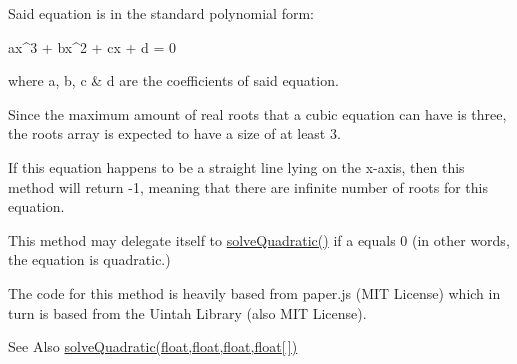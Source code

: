 Said equation is in the standard polynomial form\-: \begin{DoxyVerb}ax^3 + bx^2 + cx + d = 0
\end{DoxyVerb}


where {\ttfamily a}, {\ttfamily b}, {\ttfamily c} \& {\ttfamily d} are the coefficients of said equation.

Since the maximum amount of real roots that a cubic equation can have is three, the {\ttfamily roots} array is expected to have a size of at least 3.

If this equation happens to be a straight line lying on the x-\/axis, then this method will return {\ttfamily -\/1}, meaning that there are infinite number of roots for this equation.

This method may delegate itself to {\ttfamily \hyperlink{classhype_1_1core_1_1util_1_1_h_math_a609af488b52d1819028d7564c649dadd}{solve\-Quadratic()}} if {\ttfamily a} equals 0 (in other words, the equation is quadratic.)

The code for this method is heavily based from paper.\-js (M\-I\-T License) which in turn is based from the Uintah Library (also M\-I\-T License).

\begin{DoxySeeAlso}{See Also}
\hyperlink{classhype_1_1core_1_1util_1_1_h_math_a609af488b52d1819028d7564c649dadd}{solve\-Quadratic(float,float,float,float\mbox{[}$\,$\mbox{]})} 
\end{DoxySeeAlso}

